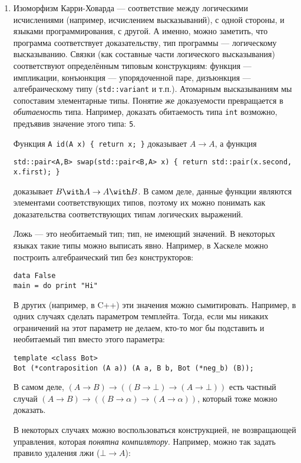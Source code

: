 \documentclass[10pt,a4paper,oneside]{article}
\begin{document}
\begin{enumerate}
\item Изоморфизм Карри-Ховарда --- соответствие между логическими исчислениями (например, исчислением высказываний), с одной стороны, и 
языками программирования, с другой. А именно, можно заметить, что программа соответствует доказательству, тип программы --- 
логическому высказыванию. Связки (как составные части логического высказывания) соответствуют определённым типовым конструкциям:
функция --- импликации, конъюнкция --- упорядоченной паре, дизъюнкция --- алгебраическому типу (\verb!std::variant! и т.п.).
Атомарным высказываниям мы сопоставим элементарные типы. Понятие же доказуемости превращается в \emph{обитаемость} типа.
Например, доказать обитаемость типа \verb!int! возможно, предъявив значение этого типа: \verb!5!.

Функция \verb!A id(A x) { return x; }! доказывает $A \rightarrow A$, а функция 
\begin{verbatim}
std::pair<A,B> swap(std::pair<B,A> x) { return std::pair(x.second, x.first); }
\end{verbatim}
доказывает $B\with A \rightarrow A \with B$. В самом деле, данные функции являются элементами соответствующих
типов, поэтому их можно понимать как доказательства соответствующих типам логических выражений.

Ложь --- это необитаемый тип; тип, не имеющий значений. В некоторых языках такие типы можно выписать
явно. Например, в Хаскеле можно построить алгебраический тип без конструкторов:

\begin{verbatim}
data False
main = do print "Hi"
\end{verbatim}

В других (например, в C++) эти значения можно сымитировать. Например, в одних случаях сделать параметром темплейта.
Тогда, если мы никаких ограничений на этот параметр не делаем, кто-то мог бы подставить и необитаемый тип вместо этого параметра:

\begin{verbatim}
template <class Bot>
Bot (*contraposition (A a)) (A a, B b, Bot (*neg_b) (B));
\end{verbatim}

В самом деле, $(A \rightarrow B) \rightarrow ((B \rightarrow \bot) \rightarrow (A \rightarrow \bot))$ есть частный
случай $(A \rightarrow B) \rightarrow ((B \rightarrow \alpha) \rightarrow (A \rightarrow \alpha))$, который тоже можно доказать.

В некоторых случаях можно воспользоваться конструкцией, не возвращающей управления, которая \emph{понятна компилятору}. Например, 
можно так задать правило удаления лжи ($\bot\rightarrow A$):


\end{enumerate}
\end{document}
